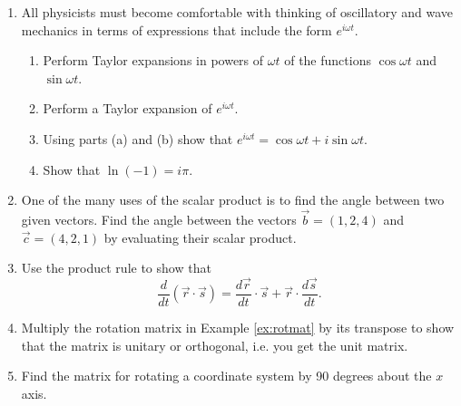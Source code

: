 \begin{enumerate}

\item All physicists must become comfortable with thinking of oscillatory and wave mechanics in terms of expressions that include the form $e^{i\omega t}$.
\begin{enumerate}
\item Perform Taylor expansions in powers of $\omega t$ of the functions $\cos\omega t$ and $\sin\omega t$.
\item Perform a Taylor expansion of $e^{i\omega t}$.
\item Using parts (a) and (b) show that $e^{i\omega t}=\cos\omega t+i\sin\omega t$.
\item Show that $\ln(-1)=i\pi$.
\end{enumerate}

\item One of the many uses of the scalar product is to find the angle between two given vectors. Find the angle between the vectors $\vec{b}=(1,2,4)$ and $\vec{c}=(4,2,1)$ by evaluating their scalar product.

\item Use the product rule to show that
\[
\frac{d}{dt}(\vec{r}\cdot\vec{s})=\frac{d\vec{r}}{dt}\cdot\vec{s}+\vec{r}\cdot\frac{d\vec{s}}{dt}.
\]

\item Multiply the rotation matrix in Example \ref{ex:rotmat} by its transpose to show that the matrix is unitary or orthogonal, i.e. you get the unit matrix.

\item Find the matrix for rotating a coordinate system by 90 degrees about the $x$ axis.

\begin{comment}

\item Consider a rotation where in the new coordinate system the three axes are at angles $\alpha$, $\beta$ and $\gamma$ relative to the original $x$ axis. Show that
\[
\cos^2\alpha+\cos^2\beta+\cos^2\gamma=1.
\]

\item Find the rotation matrix for each of the three rotations, then find the matrix for the combined rotations.
First rotate by 90$^\circ$ around the $y$ axis to get to the primed system. Then rotate the primed system 90$^\circ$ about the new $z$ axis to get to the doubly primed system. Then find the matrix that rotates the doubly primed coordinate system 90$^\circ$ about the new $x$ axis to get to the triply primed system. Finally, find the matrix that performs all three operations sequentially.


\end{comment}
\end{enumerate}
